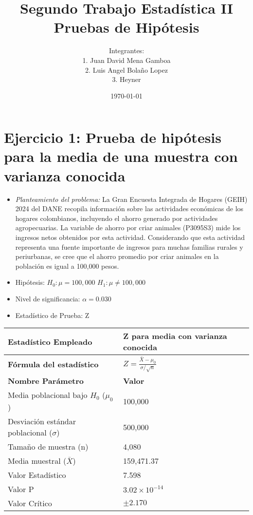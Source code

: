 \documentclass[12pt,a4paper]{article}
\title{\textbf{Segundo Trabajo Estadística II} \\[0.5cm]
Pruebas de Hipótesis}
\author{
Integrantes: \\ 
1. Juan David Mena Gamboa \\ 
2. Luis Angel Bolaño Lopez \\ 
3. Heyner}
\date{\today}
\begin{document}
\maketitle

\section*{Ejercicio 1: Prueba de hipótesis para la media de una muestra con varianza conocida}
\begin{itemize}
    \item \textit{Planteamiento del problema:} La Gran Encuesta Integrada de Hogares (GEIH) 2024 del DANE recopila información sobre las actividades económicas de los hogares colombianos, incluyendo el ahorro generado por actividades agropecuarias. La variable de ahorro por criar animales (P3095S3) mide los ingresos netos obtenidos por esta actividad. Considerando que esta actividad representa una fuente importante de ingresos para muchas familias rurales y periurbanas, se cree que el ahorro promedio por criar animales en la población es igual a 100,000 pesos.
    \item Hipótesis: \quad $H_0: \mu = 100,000$ \hspace{2cm} $H_1: \mu \neq 100,000$
    \item Nivel de significancia: $\alpha = 0.030$
    \item Estadístico de Prueba: Z
\end{itemize}

\begin{tabular}{|m{7cm}|m{7cm}|}
\hline
\textbf{Estadístico Empleado} & Z para media con varianza conocida \\ \hline
\textbf{Fórmula del estadístico} & $Z = \frac{\bar{X} - \mu_0}{\sigma/\sqrt{n}}$ \\ \hline
\textbf{Nombre Parámetro} & \textbf{Valor} \\ \hline
Media poblacional bajo $H_0$ ($\mu_0$) & 100,000 \\ \hline
Desviación estándar poblacional ($\sigma$) & 500,000 \\ \hline
Tamaño de muestra (n) & 4,080 \\ \hline
Media muestral ($\bar{X}$) & 159,471.37 \\ \hline
Valor Estadístico & 7.598 \\ \hline
Valor P & $3.02 \times 10^{-14}$ \\ \hline
Valor Crítico & $\pm 2.170$ \\ \hline
\end{tabular}
\end{document}
